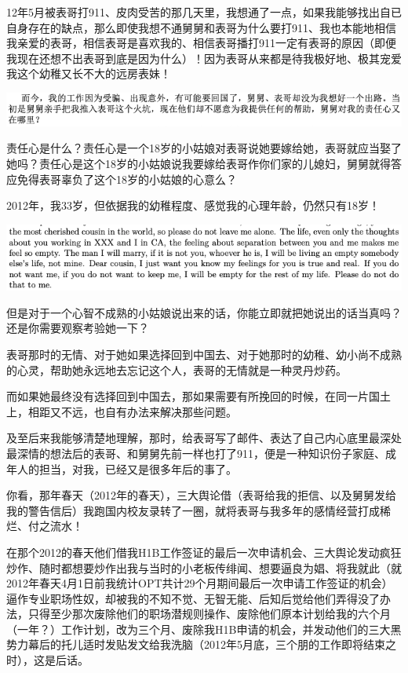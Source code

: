 \documentclass[9pt, b5paper]{article}
\begin{document}
12年5月被表哥打911、皮肉受苦的那几天里，我想通了一点，如果我能够找出自已自身存在的缺点，那么即使我想不通舅舅和表哥为什么要打911、我也本能地相信我亲爱的表哥，相信表哥是喜欢我的、相信表哥播打911一定有表哥的原因（即便我现在还想不出表哥到底是因为什么）！因为表哥从来都是待我极好地、极其宠爱我这个幼稚又长不大的远房表妹！

\begin{center}
\includegraphics[width=.9\linewidth]{./pic/p1p136-4.png}
\end{center}

责任心是什么？责任心是一个18岁的小姑娘对表哥说她要嫁给她，表哥就应当娶了她吗？责任心是这个18岁的小姑娘说我要嫁给表哥作你们家的儿媳妇，舅舅就得答应免得表哥辜负了这个18岁的小姑娘的心意么？

2012年，我33岁，但依据我的幼稚程度、感觉我的心理年龄，仍然只有18岁！

\begin{center}
\includegraphics[width=.9\linewidth]{./pic/p1p116-9.png}
\end{center}

但是对于一个心智不成熟的小姑娘说出来的话，你能立即就把她说出的话当真吗？还是你需要观察考验她一下？

表哥那时的无情、对于她如果选择回到中国去、对于她那时的幼稚、幼小尚不成熟的心灵，帮助她永远地去忘记这个人，表哥的无情就是一种灵丹炒药。

而如果她最终没有选择回到中国去，那如果需要有所挽回的时候，在同一片国土上，相距又不远，也自有办法来解决那些问题。 

及至后来我能够清楚地理解，那时，给表哥写了邮件、表达了自己内心底里最深处最深情的想法后的表哥、和舅舅先前一样也打了911，便是一种知识份子家庭、成年人的担当，对我，已经又是很多年后的事了。 

你看，那年春天（2012年的春天），三大舆论借（表哥给我的拒信、以及舅舅发给我的警告信后）我跑国内校友录转了一圈，就将表哥与我多年的感情经营打成稀烂、付之流水！

在那个2012的春天他们借我H1B工作签证的最后一次申请机会、三大舆论发动疯狂炒作、随时都想要炒作出我与当时的小老板传绯闻、想要逼良为娼、将我就此（就2012年春天4月1日前我统计OPT共计29个月期间最后一次申请工作签证的机会）逼作专业职场性奴，却被我的不知不觉、无智无能、后知后觉给他们弄得没了办法，只得至少那次废除他们的职场潜规则操作、废除他们原本计划给我的六个月（一年？）工作计划，改为三个月、废除我H1B申请的机会，并发动他们的三大黑势力幕后的托儿适时发贴发文给我洗脑（2012年5月底，三个朋的工作即将结束之时），这是后话。 
\end{document}
